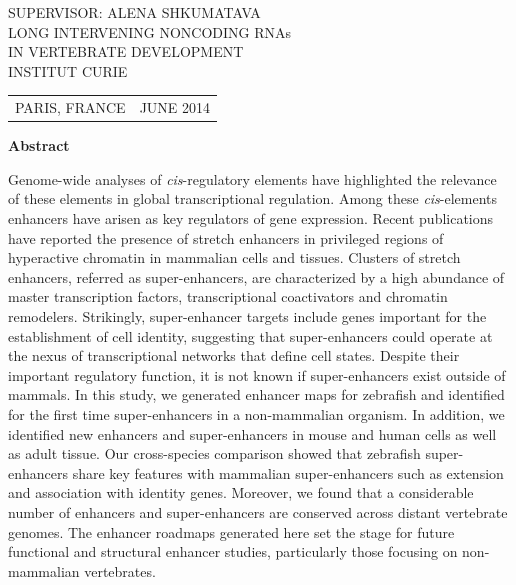 \documentclass[a4paper,12pt,oneside]{article}
\begin{document}
\begin{titlepage}
\begin{minipage}{0.85\textwidth}
\begin{center}
				SUPERVISOR: ALENA SHKUMATAVA\\\vspace{0.7mm}LONG INTERVENING NONCODING RNAs\\IN VERTEBRATE DEVELOPMENT\\INSTITUT CURIE\\[0.3cm]
				\begin{center}
					\begin{tabular}{l r}
						PARIS, FRANCE\hspace{2cm} & JUNE 2014
					\end{tabular}
				\end{center}
			\end{center}
		\end{minipage}

	\end{titlepage}

	\newpage

	\begin{center}
		\textbf{Abstract}
	\end{center}
		Genome-wide analyses of \textit{cis}-regulatory elements have highlighted the relevance of these elements in global transcriptional regulation. Among these \textit{cis}-elements enhancers have arisen as key regulators of gene expression. Recent publications have reported the presence of stretch enhancers in privileged regions of hyperactive chromatin in mammalian cells and tissues. Clusters of stretch enhancers, referred as super-enhancers, are characterized by a high abundance of master transcription factors, transcriptional coactivators and chromatin remodelers. Strikingly, super-enhancer targets include genes important for the establishment of cell identity, suggesting that super-enhancers could operate at the nexus of transcriptional networks that define cell states. Despite their important regulatory function, it is not known if super-enhancers exist outside of mammals. In this study, we generated enhancer maps for zebrafish and identified for the first time super-enhancers in a non-mammalian organism. In addition, we identified new enhancers and super-enhancers in mouse and human cells as well as adult tissue. Our cross-species comparison showed that zebrafish super-enhancers share key features with mammalian super-enhancers such as extension and association with identity genes. Moreover, we found that a considerable number of  enhancers and super-enhancers are conserved across distant vertebrate genomes. The enhancer roadmaps generated here set the stage for future functional and structural enhancer studies, particularly those focusing on non-mammalian vertebrates.\\
\end{document}
